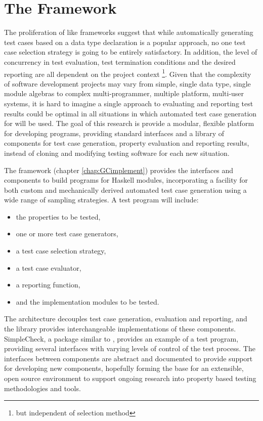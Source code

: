 \section{The \GC Framework}

The proliferation of \QC like \pbt frameworks
suggest that while automatically generating test cases
based on a data type declaration is a popular approach,
no one test case selection strategy is going to be entirely satisfactory.
In addition,
the level of concurrency in test evaluation,
test termination conditions and the desired reporting
are all dependent on the project context
\footnote{but independent of selection method}.
Given that the complexity of software development projects
may vary from simple, single data type, single module algebras to
complex multi-programmer, multiple platform, multi-user systems,
it is hard to imagine a single approach to evaluating and reporting test results
could be optimal in all situations in which
automated test case generation for \pbt will be used.
The goal of this research is provide  a modular, flexible platform for developing \pbt programs,
providing standard interfaces and a library of components for 
test case generation, property evaluation and reporting results,
instead of cloning and modifying testing software for each new situation.

The \GC framework (chapter \ref{chap:GCimplement}) provides
the interfaces and components to build \pbt programs for Haskell modules,
incorporating a facility for both custom and mechanically derived 
automated test case generation using a wide range of sampling strategies.
A \GC test program will include:

\begin{itemize}
\item the properties to be tested,
\item one or more test case generators,
\item a test case selection strategy,
\item a test case evaluator,
\item a reporting function,
\item and the implementation modules to be tested.
\end{itemize}

\noindent The architecture decouples test case generation, 
evaluation and reporting,
and the library provides interchangeable implementations of these components.
SimpleCheck, a package similar to \QC, 
provides an example of a \GC test program,
providing several interfaces with varying  levels of control of the test process.
The interfaces between components are abstract and documented to provide 
support for developing new components,
hopefully forming the base for an extensible, open source environment to 
support ongoing research into property based testing methodologies and tools.

